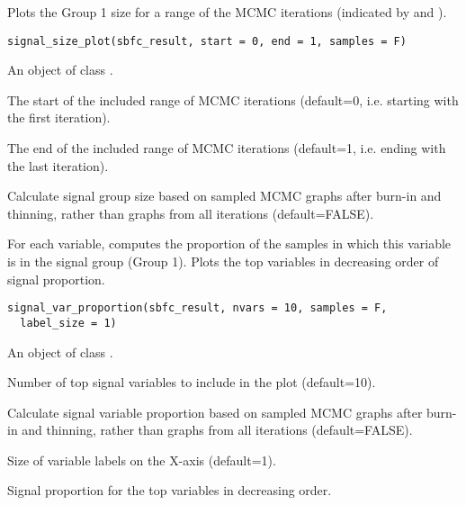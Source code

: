 \documentclass[a4paper]{book}
\begin{document}
%
\begin{Description}\relax
Plots the Group 1 size for a range of the MCMC iterations (indicated by  and ).
\end{Description}
%
\begin{Usage}
\begin{verbatim}
signal_size_plot(sbfc_result, start = 0, end = 1, samples = F)
\end{verbatim}
\end{Usage}
%
\begin{Arguments}
\begin{ldescription}
\item[\code{sbfc\_result}] An object of class .

\item[\code{start}] The start of the included range of MCMC iterations (default=0, i.e. starting with the first iteration).

\item[\code{end}] The end of the included range of MCMC iterations (default=1, i.e. ending with the last iteration).

\item[\code{samples}] Calculate signal group size based on sampled MCMC graphs after burn-in and thinning,
rather than graphs from all iterations (default=FALSE).
\end{ldescription}
\end{Arguments}
%
\begin{Description}\relax
For each variable, computes the proportion of the samples in which this variable is in the signal group (Group 1). 
Plots the top  variables in decreasing order of signal proportion.
\end{Description}
%
\begin{Usage}
\begin{verbatim}
signal_var_proportion(sbfc_result, nvars = 10, samples = F,
  label_size = 1)
\end{verbatim}
\end{Usage}
%
\begin{Arguments}
\begin{ldescription}
\item[\code{sbfc\_result}] An object of class .

\item[\code{nvars}] Number of top signal variables to include in the plot (default=10).

\item[\code{samples}] Calculate signal variable proportion based on sampled MCMC graphs after burn-in and thinning,
rather than graphs from all iterations (default=FALSE).

\item[\code{label\_size}] Size of variable labels on the X-axis (default=1).
\end{ldescription}
\end{Arguments}
%
\begin{Value}
Signal proportion for the top  variables in decreasing order.
\end{Value}
\printindex{}
\end{document}
